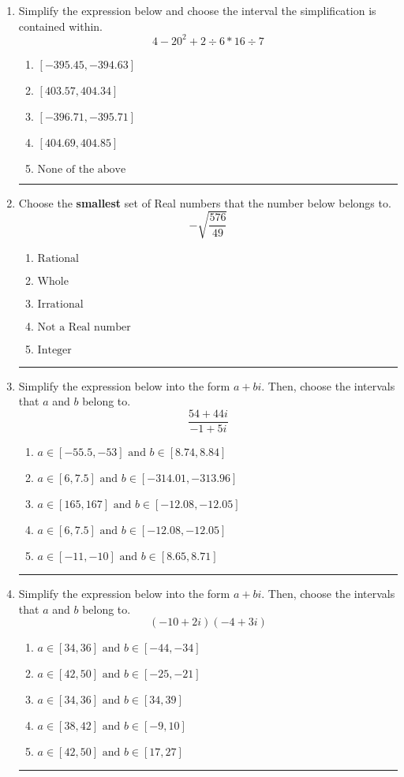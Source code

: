 \documentclass[14pt]{extbook}
\newcommand{\litem}[1]{\item#1\hspace*{-1cm}\rule{\textwidth}{0.4pt}}
\begin{document}
\begin{enumerate}
\litem{
Simplify the expression below and choose the interval the simplification is contained within.\[ 4 - 20^2 + 2 \div 6 * 16 \div 7 \]\begin{enumerate}[label=\Alph*.]
\item \( [-395.45, -394.63] \)
\item \( [403.57, 404.34] \)
\item \( [-396.71, -395.71] \)
\item \( [404.69, 404.85] \)
\item \( \text{None of the above} \)

\end{enumerate} }
\litem{
Choose the \textbf{smallest} set of Real numbers that the number below belongs to.\[ -\sqrt{\frac{576}{49}} \]\begin{enumerate}[label=\Alph*.]
\item \( \text{Rational} \)
\item \( \text{Whole} \)
\item \( \text{Irrational} \)
\item \( \text{Not a Real number} \)
\item \( \text{Integer} \)

\end{enumerate} }
\litem{
Simplify the expression below into the form $a+bi$. Then, choose the intervals that $a$ and $b$ belong to.\[ \frac{54 + 44 i}{-1 + 5 i} \]\begin{enumerate}[label=\Alph*.]
\item \( a \in [-55.5, -53] \text{ and } b \in [8.74, 8.84] \)
\item \( a \in [6, 7.5] \text{ and } b \in [-314.01, -313.96] \)
\item \( a \in [165, 167] \text{ and } b \in [-12.08, -12.05] \)
\item \( a \in [6, 7.5] \text{ and } b \in [-12.08, -12.05] \)
\item \( a \in [-11, -10] \text{ and } b \in [8.65, 8.71] \)

\end{enumerate} }
\litem{
Simplify the expression below into the form $a+bi$. Then, choose the intervals that $a$ and $b$ belong to.\[ (-10 + 2 i)(-4 + 3 i) \]\begin{enumerate}[label=\Alph*.]
\item \( a \in [34, 36] \text{ and } b \in [-44, -34] \)
\item \( a \in [42, 50] \text{ and } b \in [-25, -21] \)
\item \( a \in [34, 36] \text{ and } b \in [34, 39] \)
\item \( a \in [38, 42] \text{ and } b \in [-9, 10] \)
\item \( a \in [42, 50] \text{ and } b \in [17, 27] \)


\end{enumerate}}
\end{enumerate}
\end{document}
